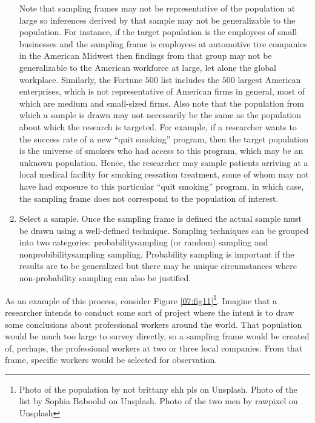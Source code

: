 \begin{enumerate}
	Note that sampling frames may not be representative of the population at large so inferences derived by that sample may not be generalizable to the population. For instance, if the target population is the employees of small businesses and the sampling frame is employees at automotive tire companies in the American Midwest then findings from that group may not be generalizable to the American workforce at large, let alone the global workplace. Similarly, the Fortune $ 500 $ list includes the $ 500 $ largest American enterprises, which is not representative of American firms in general, most of which are medium and small-sized firms. Also note that the population from which a sample is drawn may not necessarily be the same as the population about which the research is targeted. For example, if a researcher wants to the success rate of a new ``quit smoking'' program, then the target population is the universe of smokers who had access to this program, which may be an unknown population. Hence, the researcher may sample patients arriving at a local medical facility for smoking cessation treatment, some of whom may not have had exposure to this particular ``quit smoking'' program, in which case, the sampling frame does not correspond to the population of interest.

	\item Select a sample. Once the sampling frame is defined the actual sample must be drawn using a well-defined technique. Sampling techniques can be grouped into two categories: \gls{probabilitysampling} (or random) sampling and \gls{nonprobibilitysampling} sampling. Probability sampling is important if the results are to be generalized but there may be unique circumstances where non-probability sampling can also be justified.

\end{enumerate}

As an example of this process, consider Figure \ref{07:fig11}\footnote{Photo of the population by not brittany shh pls on Unsplash. Photo of the list by Sophia Baboolal on Unsplash. Photo of the two men by rawpixel on Unsplash}. Imagine that a researcher intends to conduct some sort of project where the intent is to draw some conclusions about professional workers around the world. That population would be much too large to survey directly, so a sampling frame would be created of, perhaps, the professional workers at two or three local companies. From that frame, specific workers would be selected for observation.

